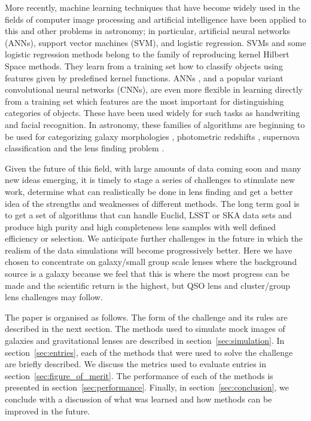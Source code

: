 \documentclass{aa}
\begin{document}
More recently, machine learning techniques that have become widely used in the fields of computer image processing and artificial intelligence have been applied to this  and other problems in astronomy; in particular, artificial neural networks (ANNs), support vector machines (SVM), and logistic regression.  SVMs and some logistic regression methods belong to the family of reproducing kernel Hilbert Space methods. They learn from a training set how to classify objects using features given by predefined kernel functions.  ANNs , and a popular variant convolutional neural networks (CNNs),  are even more flexible in learning directly from a training set which features are the most important for distinguishing categories of objects.  These have been used widely for such tasks as handwriting and facial recognition.  In astronomy, these families of algorithms are beginning to be used for categorizing galaxy morphologies \citep{2015MNRAS.450.1441D}, photometric redshifts \citep{2017MNRAS.465.1959C,2016PASP..128j4502S,2017NewA...51..169S}, supernova classification \citep{2016ApJS..225...31L} and the lens finding problem \citep{2017arXiv170207675P,2017MNRAS.471..167J,2017MNRAS.465.4325O,2017AandA...597A.135B,hartley2017support}.

Given the future of this field, with large amounts of data coming soon and many new ideas emerging, it is timely to stage a series of challenges to stimulate new work, determine what can realistically be done in lens finding and get a better idea of the strengths and weaknesses of different methods.  The long term goal is to get a set of algorithms that can handle Euclid, LSST or SKA data sets and produce high purity and high completeness lens samples with well defined efficiency or selection.  We anticipate further challenges in the future in which the realism of the data simulations will become progressively better.  Here we have chosen to concentrate on galaxy/small group scale lenses where the background source is a galaxy because we feel that this is where the most progress can be made and the scientific return is the highest, but QSO lens and cluster/group lens challenges may follow.

The paper is organised as follows.  The form of the challenge and its rules are described in the next section.  The methods used to simulate mock images of galaxies and gravitational lenses are described in section~\ref{sec:simulation}.  In section~\ref{sec:entries}, each of the methods that were used to solve the challenge are briefly described.  We discuss the metrics used to evaluate entries in section~\ref{sec:figure_of_merit}.  The performance of each of the methods is presented in section~\ref{sec:performance}.  Finally,  in section~\ref{sec:conclusion}, we conclude with a discussion of what was learned and how methods can be improved in the future.
\end{document}
